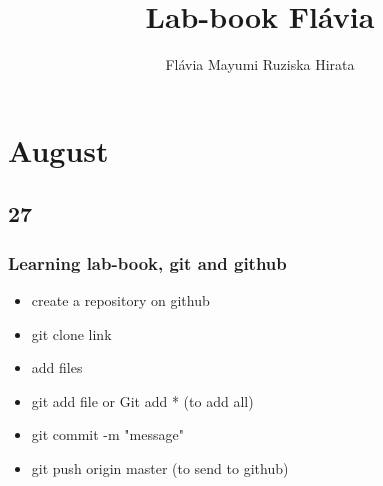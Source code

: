 \documentclass[a4paper, 12pt, titlepage]{report}
\title{Lab-book Flávia\\}
\author{Flávia Mayumi Ruziska Hirata }
\date{}
\begin{document}
\maketitle

\chapter{August}
\section{27}
\subsection{Learning lab-book, git and github}

\begin{itemize}
	\item create a repository on github
	\item git clone link
	\item add files 
	\item git add file or Git add * (to add all)
	\item git commit -m "message"
	\item git push origin master (to send to github)
\end{itemize}

\printbibliography
\end{document}
